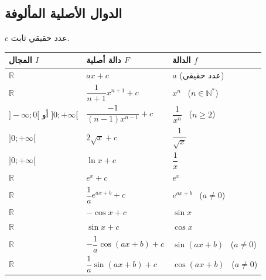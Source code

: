 \documentclass[12pt,a4paper]{article}
\newcommand{\N}{\mathbb{N}}
\newcommand{\R}{\mathbb{R}}
\begin{document}
\subsection{الدوال الأصلية المألوفة}
$c$ عدد حقيقي ثابت.
\begin{center}
\renewcommand{\arraystretch}{1.55}
\begin{tabular}{|>{\centering\arraybackslash}p{}|>{\centering\arraybackslash}p{}|>{\centering\arraybackslash}p{}|}\hline
\rowcolor{cSec!12}\textbf{المجال $I$} & \textbf{دالة أصلية $F$} & \textbf{الدالة $f$}\\\hline
$\R$ & $ax+c$ & $a$ (عدد حقيقي)\\\hline
$\R$ & $\dfrac{1}{n+1}x^{n+1}+c$ & $x^{n}$ \ ($n\in\N^{*}$)\\\hline
$]-\infty;0[$ أو $]0;+\infty[$ & $\dfrac{-1}{(n-1)x^{n-1}}+c$ & $\dfrac{1}{x^{n}}$ \ ($n\geqslant 2$)\\\hline
$]0;+\infty[$ & $2\sqrt{x}+c$ & $\dfrac{1}{\sqrt{x}}$\\\hline
$]0;+\infty[$ & $\ln x+c$ & $\dfrac{1}{x}$\\\hline
$\R$ & $e^{x}+c$ & $e^{x}$\\\hline
$\R$ & $\dfrac{1}{a}e^{ax+b}+c$ & $e^{ax+b}$ \ ($a\neq 0$)\\\hline
$\R$ & $-\cos x+c$ & $\sin x$\\\hline
$\R$ & $\sin x+c$ & $\cos x$\\\hline
$\R$ & $-\dfrac{1}{a}\cos(ax+b)+c$ & $\sin(ax+b)$ \ ($a\neq 0$)\\\hline
$\R$ & $\dfrac{1}{a}\sin(ax+b)+c$ & $\cos(ax+b)$ \ ($a\neq 0$)\\\hline
\end{tabular}
\end{center}
\end{document}
